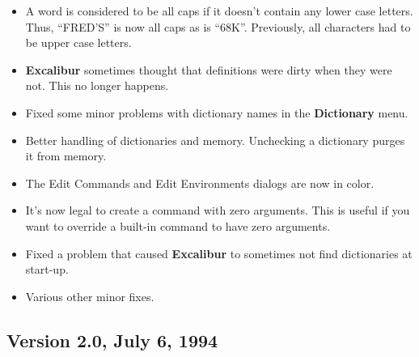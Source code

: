 \documentclass[11pt,titlepage]{article}
\newcommand{\ex}{\textbf{Excalibur}}
\begin{document}
\begin{itemize}
\item A word is considered to be all caps if it doesn't contain any
  lower case letters.  Thus, ``FRED'S'' is now all caps as is ``68K''.
  Previously, all characters had to be upper case letters.

\item \ex{} sometimes thought that definitions were dirty when they
  were not.  This no longer happens.

\item Fixed some minor problems with dictionary names in the
  \textbf{Dictionary} menu.

\item Better handling of dictionaries and memory.  Unchecking a
  dictionary purges it from memory.

\item The Edit Commands and Edit Environments dialogs are now in
  color.

\item It's now legal to create a command with zero arguments.  This is
  useful if you want to override a built-in command to have zero
  arguments.

\item Fixed a problem that caused \ex{} to sometimes not find
  dictionaries at start-up.

\item Various other minor fixes.

\end{itemize}

\subsection{Version 2.0, July 6, 1994}
\end{document}
